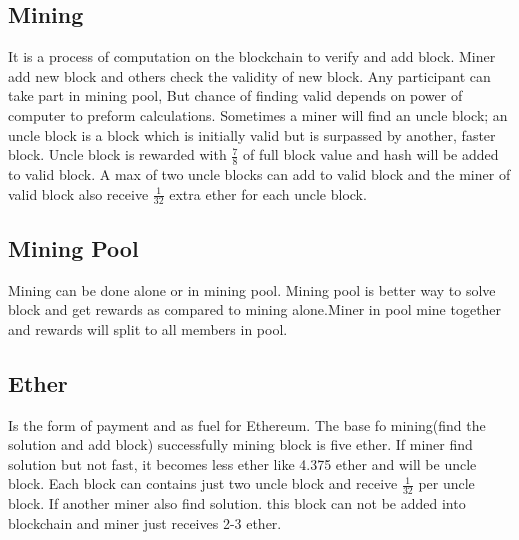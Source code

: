 \subsection{Mining}
It is a process of computation on the blockchain to verify and add block. Miner add new block and others check the validity of new block. Any participant can take part in mining pool, But chance of finding valid depends on power of computer to preform calculations. Sometimes a miner will find an uncle block; an uncle block is a block which is initially valid but is surpassed by another, faster block. Uncle block is rewarded with $\frac{7}{8}$ of full block value and hash will be added to valid block. A max of two uncle blocks can add to valid block and the miner of valid block also receive $\frac{1}{32}$ extra ether for each uncle block\cite{Egbertsen}.
\subsection{Mining Pool} Mining can be done alone or in mining pool. Mining pool is better way to solve block and get rewards as compared to mining alone.Miner in pool mine together and rewards will split to all members in pool\cite{Egbertsen}.
\subsection{Ether} Is the form of payment and as fuel for Ethereum. The base fo mining(find the solution and add block) successfully mining block is five ether. If miner find solution but not fast, it becomes less ether like 4.375 ether and will be uncle block. Each block can contains just two uncle block and receive $\frac{1}{32}$ per uncle block. If another miner also find solution. this block can not be added into blockchain and miner just receives 2-3 ether\cite{Egbertsen}.
 
